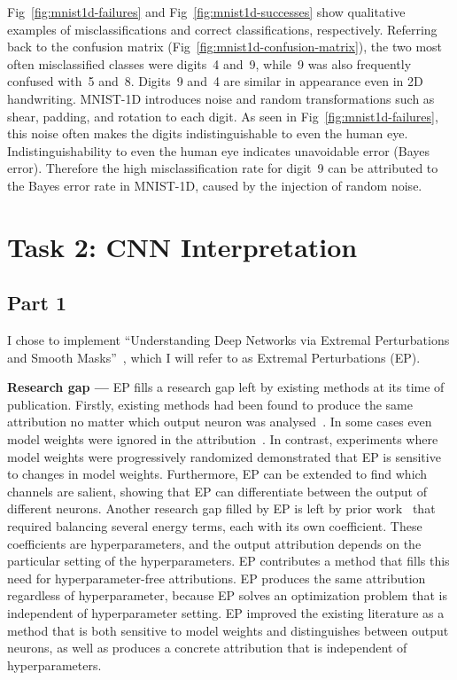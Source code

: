\documentclass{article}
\newcommand{\myparagraph}[1]{\noindent\textbf{#1 ---}}
\begin{document}
Fig~\ref{fig:mnist1d-failures} and Fig~\ref{fig:mnist1d-successes} show qualitative examples of misclassifications and correct classifications, respectively.
Referring back to the confusion matrix (Fig~\ref{fig:mnist1d-confusion-matrix}), the two most often misclassified classes were digits~\num{4} and~\num{9}, while~\num{9} was also frequently confused with~\num{5} and~\num{8}.
Digits~\num{9} and~\num{4} are similar in appearance even in 2D handwriting.
MNIST-1D introduces noise and random transformations such as shear, padding, and rotation to each digit.
As seen in Fig~\ref{fig:mnist1d-failures}, this noise often makes the digits indistinguishable to even the human eye.
Indistinguishability to even the human eye indicates unavoidable error (Bayes error).
Therefore the high misclassification rate for digit~\num{9} can be attributed to the Bayes error rate in MNIST-1D, caused by the injection of random noise.


\section{Task 2: CNN Interpretation}


\subsection{Part 1}

I chose to implement ``Understanding Deep Networks via Extremal Perturbations and Smooth Masks''~\cite{fong2019understanding}, which I will refer to as Extremal Perturbations (EP).

\myparagraph{Research gap} EP fills a research gap left by existing methods at its time of publication.
Firstly, existing methods had been found to produce the same attribution no matter which output neuron was analysed~\cite{mahendran2016salient}.
In some cases even model weights were ignored in the attribution~\cite{adebayo2018sanity}.
In contrast, experiments where model weights were progressively randomized demonstrated that EP is sensitive to changes in model weights.
Furthermore, EP can be extended to find which channels are salient, showing that EP can differentiate between the output of different neurons.
Another research gap filled by EP is left by prior work~\cite{fong2017interpretable} that required balancing several energy terms, each with its own coefficient.
These coefficients are hyperparameters, and the output attribution depends on the particular setting of the hyperparameters.
EP contributes a method that fills this need for hyperparameter-free attributions.
EP produces the same attribution regardless of hyperparameter, because EP solves an optimization problem that is independent of hyperparameter setting.
EP improved the existing literature as a method that is both sensitive to model weights and distinguishes between output neurons, as well as produces a concrete attribution that is independent of hyperparameters.
\end{document}
